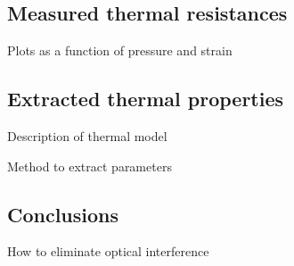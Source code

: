 \subsection{Measured thermal resistances}
Plots as a function of pressure and strain

\subsection{Extracted thermal properties}
Description of thermal model

Method to extract parameters

\subsection{Conclusions}
How to eliminate optical interference